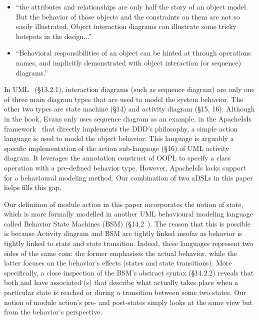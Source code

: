 \begin{itemize}
  \item ``the attributes and relationships are only half the story of an object model. But the behavior of those objects and the constraints on them are not so easily illustrated. Object interaction diagrams can illustrate some tricky hotspots in the design...''
  
  \item ``Behavioral responsibilities of an object can be hinted at through operations names, and implicitly
  demonstrated with object interaction (or sequence) diagrams.''
\end{itemize}

In UML~\cite{omg_unified_2015} (\S{13.2.1}), interaction diagrams (such as sequence diagram) are only one of three main diagram types that are used to model the system behavior. The other two types are state machine (\S{14}) and activity diagram (\S{15, 16}). Although in the book, Evans only uses sequence diagram as an example, in the ApacheIsIs framework~\cite{dan_haywood_apache_2013} that directly implements the DDD's philosophy, a simple action language is used to model the object behavior. This language is arguably a specific implementation of the action sub-language (\S{16}) of UML activity diagram. It leverages the annotation construct of OOPL to specify a class operation with a pre-defined behavior type. 
However, ApacheIsIs lacks support for a behavioural modeling method. Our combination of two aDSLs in this paper helps fills this gap.

Our definition of module action in this paper incorporates the notion of state, which is more formally modelled in another UML behavioural modeling language called Behavior State Machines (BSM) (\S{14.2}~\cite{omg_unified_2015}). The reason that this is possible is because Activity diagram and BSM are tightly linked insofar as behavior is tightly linked to state and state transition. Indeed, these languages represent two sides of the same coin: the former emphasises the actual behavior, while the latter focuses on the behavior's effects (states and state transitions). More specifically, a close inspection of the BSM's abstract syntax (\S{14.2.2}) reveals that both  and  have associated (s) that describe what actually takes place when a particular state is reached or during a transition between some two states.
Our notion of module action's pre- and post-states simply looks at the same view but from the behavior's perspective.


